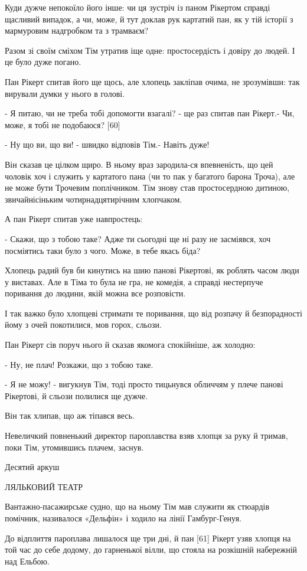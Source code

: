 Куди дужче непокоїло його інше: чи ця зустріч із паном Рікертом справді щасливий випадок, а чи, може, й тут доклав рук картатий пан, як у тій історії з мармуровим надгробком та з трамваєм?

Разом зі своїм сміхом Тім утратив іще одне: простосердість і довіру до людей. І це було дуже погано.

Пан Рікерт спитав його ще щось, але хлопець закліпав очима, не зрозумівши: так вирували думки у нього в голові.

- Я питаю, чи не треба тобі допомогти взагалі? - ще раз спитав пан Рікерт.- Чи, може, я тобі не подобаюся? [60]

- Ну що ви, що ви! - швидко відповів Тім.- Навіть дуже!

Він сказав це цілком щиро. В ньому враз зародила-ся впевненість, що цей чоловік хоч і служить у картатого пана (чи то пак у багатого барона Троча), але не може бути Трочевим поплічником. Тім знову став простосердною дитиною, звичайнісіньким чотирнадцятирічним хлопчаком.

А пан Рікерт спитав уже навпростець:

- Скажи, що з тобою таке? Адже ти сьогодні ще ні разу не засміявся, хоч посміятись таки було з чого. Може, в тебе якась біда?

Хлопець радий був би кинутись на шию панові Рікертові, як роблять часом люди у виставах. Але в Тіма то була не гра, не комедія, а справді нестерпуче поривання до людини, якій можна все розповісти.

І так важко було хлопцеві стримати те поривання, що від розпачу й безпорадності йому з очей покотилися, мов горох, сльози.

Пан Рікерт сів поруч нього й сказав якомога спокійніше, аж холодно:

- Ну, не плач! Розкажи, що з тобою таке.

- Я не можу! - вигукнув Тім, тоді просто тицьнувся обличчям у плече панові Рікертові, й сльози полилися ще дужче.

Він так хлипав, що аж тіпався весь.

Невеличкий повненький директор пароплавства взяв хлопця за руку й тримав, поки Тім, утомившись плачем, заснув.

Десятий аркуш

ЛЯЛЬКОВИЙ ТЕАТР

Вантажно-пасажирське судно, що на ньому Тім мав служити як стюардів помічник, називалося «Дельфін» і ходило на лінії Гамбург-Генуя.

До відплиття пароплава лишалося ще три дні, й пан [61] Рікерт узяв хлопця на той час до себе додому, до гарненької вілли, що стояла на розкішній набережній над Ельбою.

